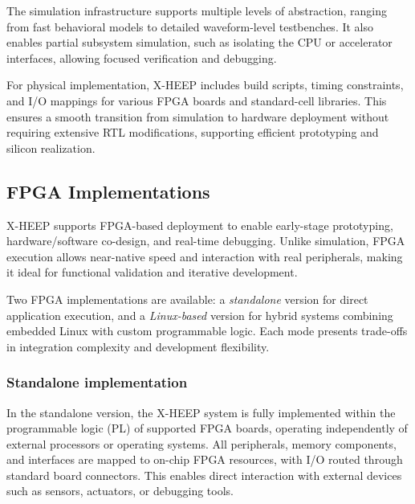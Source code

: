                The simulation infrastructure supports multiple levels of abstraction, ranging from fast behavioral models to detailed waveform-level testbenches. It also enables partial subsystem simulation, such as isolating the CPU or accelerator interfaces, allowing focused verification and debugging.
                
                For physical implementation, \mbox{X-HEEP} includes build scripts, timing constraints, and I/O mappings for various FPGA boards and standard-cell libraries. This ensures a smooth transition from simulation to hardware deployment without requiring extensive RTL modifications, supporting efficient prototyping and silicon realization.

        \vspace{-1em}
        \subsection{FPGA Implementations}
        
            \mbox{X-HEEP} supports FPGA-based deployment to enable early-stage prototyping, hardware/software co-design, and real-time debugging. Unlike simulation, FPGA execution allows near-native speed and interaction with real peripherals, making it ideal for functional validation and iterative development.
            
            Two FPGA implementations are available: a \emph{standalone} version for direct application execution, and a \emph{Linux-based} version for hybrid systems combining embedded Linux with custom programmable logic. Each mode presents trade-offs in integration complexity and development flexibility.

            \vspace{-1em}
            \subsubsection*{Standalone implementation}
        
                In the standalone version, the \mbox{X-HEEP} system is fully implemented within the programmable logic (PL) of supported FPGA boards, operating independently of external processors or operating systems. All peripherals, memory components, and interfaces are mapped to on-chip FPGA resources, with I/O routed through standard board connectors. This enables direct interaction with external devices such as sensors, actuators, or debugging tools.
                

